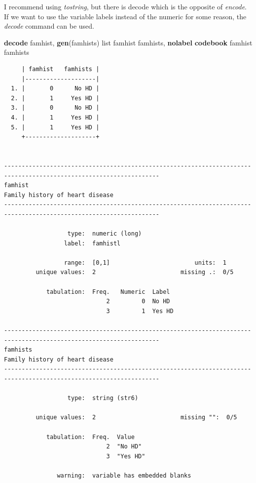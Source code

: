 \documentclass[
]{book}
\newenvironment{Shaded}{\begin{snugshade}}{\end{snugshade}}
\newcommand{\KeywordTok}[1]{\textcolor[rgb]{0.13,0.29,0.53}{\textbf{#1}}}
\newcommand{\NormalTok}[1]{#1}
\newcommand{\OtherTok}[1]{\textcolor[rgb]{0.56,0.35,0.01}{#1}}
\begin{document}
I recommend using \emph{tostring}, but there is decode which is the opposite of \emph{encode}. If we want to use the variable labels instead of the numeric for some reason, the \emph{decode} command can be used.

\begin{Shaded}
\begin{Highlighting}[]
\KeywordTok{decode}\NormalTok{ famhist, }\KeywordTok{gen}\NormalTok{(famhists)}
\OtherTok{list}\NormalTok{ famhist famhists, }\KeywordTok{nolabel}
\KeywordTok{codebook}\NormalTok{ famhist famhists}
\end{Highlighting}
\end{Shaded}

\begin{verbatim}
     | famhist   famhists |
     |--------------------|
  1. |       0      No HD |
  2. |       1     Yes HD |
  3. |       0      No HD |
  4. |       1     Yes HD |
  5. |       1     Yes HD |
     +--------------------+


------------------------------------------------------------------------------------------------------------------
famhist                                                                            Family history of heart disease
------------------------------------------------------------------------------------------------------------------

                  type:  numeric (long)
                 label:  famhistl

                 range:  [0,1]                        units:  1
         unique values:  2                        missing .:  0/5

            tabulation:  Freq.   Numeric  Label
                             2         0  No HD
                             3         1  Yes HD

------------------------------------------------------------------------------------------------------------------
famhists                                                                           Family history of heart disease
------------------------------------------------------------------------------------------------------------------

                  type:  string (str6)

         unique values:  2                        missing "":  0/5

            tabulation:  Freq.  Value
                             2  "No HD"
                             3  "Yes HD"

               warning:  variable has embedded blanks
\end{verbatim}
\end{document}
